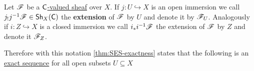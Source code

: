 \documentclass[../../main]{subfiles}
\begin{document}
\begin{notation}
  Let \(\mathscr{F}\) be a \hyperref[def:sheaf]{\(\mathsf{C}\)-valued sheaf} over \(X\).
  If \(j\colon U \hookrightarrow X\) is an open immersion we call \(j_{!}j^{-1}\mathscr{F} \in \mathsf{Sh}_{X}(\mathsf{C})\) the \textbf{extension} of \(\mathscr{F}\) by \(U\) and denote it by \(\mathscr{F}_{U}\).
  Analogously if \(i\colon Z \hookrightarrow X\) is a closed immersion we call \(i_{\ast}i^{-1}\mathscr{F}\) the extension of \(\mathscr{F}\) by \(Z\) and denote it \(\mathscr{F}_{Z}\).

  Therefore with this notation \autoref{thm:SES-exactness} states that the following is an \hyperref[def:exact-sequence]{exact sequence} for all open subsets \(U \subseteq X\)
   \begin{center}
  \end{center}
\end{notation}
\end{document}
